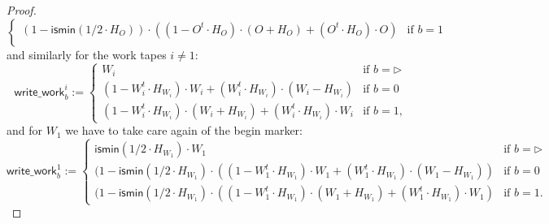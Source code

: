 \begin{proof}
$$\begin{cases}
(1-\mathsf{ismin}(1/2\cdot H_O))\cdot\left((1-O^t\cdot H_O)\cdot (O+H_O) + (O^t\cdot H_O)\cdot O\right) &\text{if $b=1$}\\
\end{cases}
$$
and similarly for the work tapes $i\neq 1$:
$$
\mathsf{write\_work}_b^i:=\begin{cases}
W_i & \text{if $b=\rhd$}\\
(1-W_i^t\cdot H_{W_i})\cdot W_i + (W_i^t\cdot H_{W_i})\cdot (W_i-H_{W_i}) &\text{if $b=0$}\\
(1-W_i^t\cdot H_{W_i})\cdot (W_i+H_{W_i}) + (W_i^t\cdot H_{W_i})\cdot W_i &\text{if $b=1$},
\end{cases}
$$
and for  $W_1$ we have to take care again of the begin marker:
$$
\mathsf{write\_work}_b^1:=\begin{cases}
\mathsf{ismin}(1/2\cdot H_{W_1})\cdot W_1 & \text{if $b=\rhd$}\\
(1-\mathsf{ismin}(1/2\cdot H_{W_1})\cdot\left((1-W_1^t\cdot H_{W_1})\cdot W_1 + (W_1^t\cdot H_{W_1})\cdot (W_1-H_{W_1})\right) &\text{if $b=0$}\\
(1-\mathsf{ismin}(1/2\cdot H_{W_1})\cdot\left((1-W_1^t\cdot H_{W_1})\cdot (W_1+H_{W_1}) + (W_1^t\cdot H_{W_1})\cdot W_1\right) &\text{if $b=1$}.
\end{cases}
$$




%
%


\end{proof}
